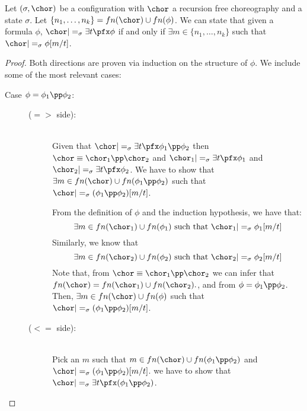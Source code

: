 \begin{lemma}\label{Logic4Struct:lem:exists}
  Let $(\sigma,\chor)$ be a configuration with $\chor$ a recursion
  free choreography and a state $\sigma$. Let $\{n_1,\dots,n_k\}
  = fn(\chor) \cup fn(\phi)$. We can state that given  a formula $\phi$, $\chor |=_\sigma \exists t\pfx
  \phi$ if and only if $\exists m\in \{n_1,\dots,n_k\}$ such that $\chor
  |=_\sigma \phi[m/t]$.
\end{lemma}
\begin{proof}
  Both directions are proven via induction on the structure of
  $\phi$. We include some of the most relevant cases:
  \begin{description}
    \item[Case  $\phi = \phi_1 \pp \phi_2 $:] \hfill 
          \begin{description}
            \item[($=>$ side):] \hfill \\
              Given that $\chor |=_\sigma \exists t\pfx \phi_1 \pp
              \phi_2$ then $\chor \equiv \chor_1 \pp \chor_2$ and
              $\chor_1 |=_\sigma \exists t \pfx \phi_1 $ and $\chor_2
              |=_\sigma \exists t \pfx \phi_2$. We have to show that
              $\exists m \in fn(\chor) \cup fn(\phi_1 \pp \phi_2)$
              such that $\chor |=_\sigma (\phi_1 \pp \phi_2)[m/t]$.

              From the definition of $\phi$ and the induction
              hypothesis, we have that: 
              \begin{equation}
                \exists m \in fn(\chor_1) \cup
              fn(\phi_1) \text{ such that } \chor_1 |=_\sigma
              \phi_1[m/t]
              \end{equation} 
              Similarly, we know that 
              \begin{equation}
                \exists m \in
              fn(\chor_2) \cup fn(\phi_2) \text{ such that } \chor_2
              |=_\sigma \phi_2[m/t]
              \end{equation} 
              Note that, from $\chor \equiv
              \chor_1 \pp \chor_2$ we can infer that $fn(\chor) =
              fn(\chor_1) \cup fn(\chor_2).$, and from $\phi = \phi_1
              \pp \phi_2$. Then, $\exists m \in fn(\chor) \cup
              fn(\phi) $ such that $\chor  |=_\sigma (\phi_1 \pp
              \phi_2)[m/t]$.

              \item[($<=$ side):] \hfill \\
                Pick an $m$ such that $m \in fn(\chor) \cup
                fn(\phi_1 \pp \phi_2)$ and $\chor |=_\sigma (\phi_1
                \pp \phi_2)[m/t]$. we have to show that $\chor
                |=_\sigma \exists t\pfx (\phi_1 \pp \phi_2)$.


\end{description}
\end{description}
\end{proof}
